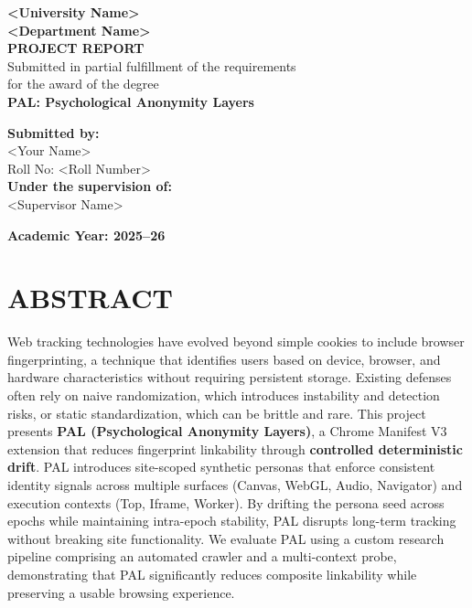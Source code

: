 \documentclass[11pt]{report}
\newcommand{\ProjectTitle}{PAL: Psychological Anonymity Layers}
\newcommand{\StudentName}{<Your Name>}
\newcommand{\RollNo}{<Roll Number>}
\newcommand{\Department}{<Department Name>}
\newcommand{\University}{<University Name>}
\newcommand{\Supervisor}{<Supervisor Name>}
\newcommand{\AcademicYear}{2025--26}
\begin{document}
\begin{titlepage}
\begin{center}
    \vspace*{12mm}
    {\Large \textbf{\University}}\\[8mm]
    {\large \textbf{\Department}}\\[18mm]

    {\Large \textbf{PROJECT REPORT}}\\[6mm]
    {\large Submitted in partial fulfillment of the requirements}\\
    {\large for the award of the degree}\\[10mm]

    {\Large \textbf{\ProjectTitle}}\\[18mm]

    \begin{flushleft}
    \textbf{Submitted by:}\\
    \StudentName\\
    Roll No: \RollNo\\[10mm]

    \textbf{Under the supervision of:}\\
    \Supervisor\\
    \end{flushleft}

    \vfill
    {\large \textbf{Academic Year: \AcademicYear}}
\end{center}
\end{titlepage}


\chapter*{ABSTRACT}

Web tracking technologies have evolved beyond simple cookies to include browser fingerprinting, a technique that identifies users based on device, browser, and hardware characteristics without requiring persistent storage. Existing defenses often rely on naive randomization, which introduces instability and detection risks, or static standardization, which can be brittle and rare. This project presents \textbf{PAL (Psychological Anonymity Layers)}, a Chrome Manifest V3 extension that reduces fingerprint linkability through \textbf{controlled deterministic drift}. PAL introduces site-scoped synthetic personas that enforce consistent identity signals across multiple surfaces (Canvas, WebGL, Audio, Navigator) and execution contexts (Top, Iframe, Worker). By drifting the persona seed across epochs while maintaining intra-epoch stability, PAL disrupts long-term tracking without breaking site functionality. We evaluate PAL using a custom research pipeline comprising an automated crawler and a multi-context probe, demonstrating that PAL significantly reduces composite linkability while preserving a usable browsing experience.
\end{document}
